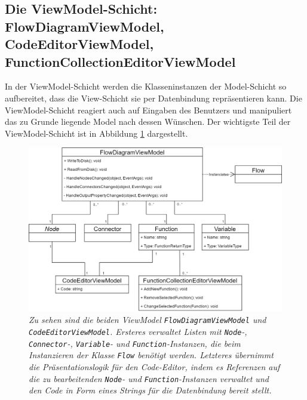 \subsection[Die ViewModel-Schicht]{Die ViewModel-Schicht: FlowDiagramViewModel, CodeEditorViewModel, FunctionCollectionEditorViewModel}
\label{subsec:Die Viewmodel-Schicht}
In der ViewModel-Schicht werden die Klasseninstanzen der Model-Schicht so aufbereitet, dass die View-Schicht sie per Datenbindung repräsentieren kann. Die ViewModel-Schicht reagiert auch auf Eingaben des Benutzers und manipuliert das zu Grunde liegende Model nach dessen Wünschen. Der wichtigste Teil der ViewModel-Schicht ist in Abbildung \ref{fig:UML:FlowViewModel} dargestellt.
\begin{figure} %
	\centering
		\includegraphics[width=\textwidth]{img/FlowDiagramViewModelUML.png}
	\caption[Klassenstruktur der ViewModel-Schicht]{\textit{Zu sehen sind die beiden ViewModel \texttt{FlowDiagramViewModel} und \texttt{CodeEditorViewModel}. Ersteres verwaltet Listen mit \texttt{Node}-, \texttt{Con\-nec\-tor}-, \texttt{Variable}- und \texttt{Function}-Instanzen, die beim Instanzieren der Klasse \texttt{Flow} benötigt werden. Letzteres übernimmt die Präsentationslogik für den Code-Editor, indem es Referenzen auf die zu bearbeitenden \texttt{Node}- und \texttt{Function}-Instanzen verwaltet und den Code in Form eines Strings für die Datenbindung bereit stellt.}}
	\label{fig:UML:FlowViewModel}
\end{figure}
